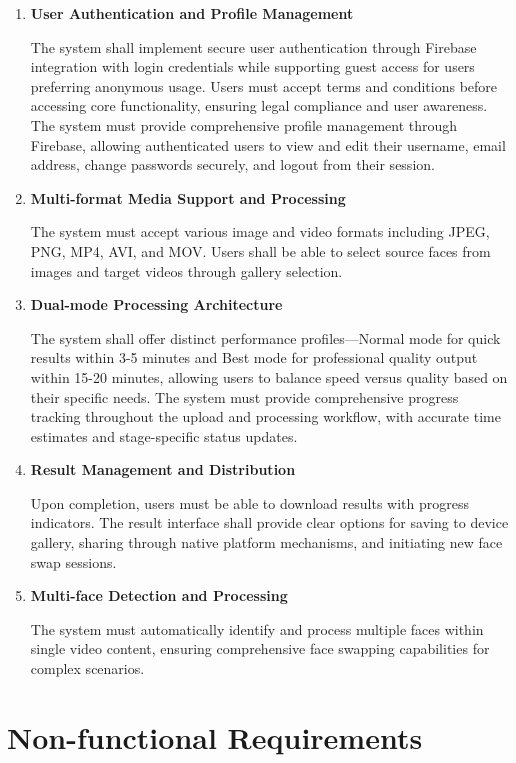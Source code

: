 \documentclass[12pt,a4paper]{report}
\begin{document}
\begin{enumerate}[label=\Roman*.]
\item \textbf{User Authentication and Profile Management}

The system shall implement secure user authentication through Firebase integration with login credentials while supporting guest access for users preferring anonymous usage. Users must accept terms and conditions before accessing core functionality, ensuring legal compliance and user awareness. The system must provide comprehensive profile management through Firebase, allowing authenticated users to view and edit their username, email address, change passwords securely, and logout from their session.

\item \textbf{Multi-format Media Support and Processing}

The system must accept various image and video formats including JPEG, PNG, MP4, AVI, and MOV. Users shall be able to select source faces from images and target videos through gallery selection.

\item \textbf{Dual-mode Processing Architecture}

The system shall offer distinct performance profiles—Normal mode for quick results within 3-5 minutes and Best mode for professional quality output within 15-20 minutes, allowing users to balance speed versus quality based on their specific needs. The system must provide comprehensive progress tracking throughout the upload and processing workflow, with accurate time estimates and stage-specific status updates.

\item \textbf{Result Management and Distribution}

Upon completion, users must be able to download results with progress indicators. The result interface shall provide clear options for saving to device gallery, sharing through native platform mechanisms, and initiating new face swap sessions.

\item \textbf{Multi-face Detection and Processing}

The system must automatically identify and process multiple faces within single video content, ensuring comprehensive face swapping capabilities for complex scenarios.
\end{enumerate}

\section{Non-functional Requirements}
\end{document}
